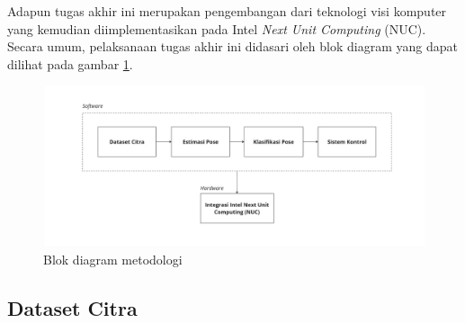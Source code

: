 
Adapun tugas akhir ini merupakan pengembangan dari teknologi visi komputer yang kemudian diimplementasikan pada Intel \emph{Next Unit Computing} (NUC). Secara umum, pelaksanaan tugas akhir ini didasari oleh blok diagram yang dapat dilihat pada gambar \ref{fig:blockdiagrammethod}.

\begin{figure}[H]
  \centering

  \includegraphics[scale=0.16]{gambar/bab3-block-diagram-nuc.jpg}

  \caption{Blok diagram metodologi}
  \label{fig:blockdiagrammethod}
\end{figure}

\subsection{Dataset Citra}
\label{sec:metodologidataset}


